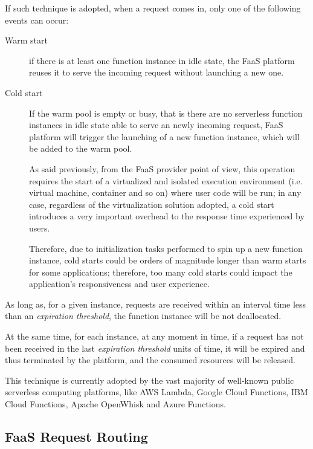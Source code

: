 \documentclass[12pt,a4paper]{report}
\begin{document}
If such technique is adopted, when a request comes in, only one of the following events can occur:

\begin{description}
	
	\item[Warm start] if there is at least one function instance in idle state, the FaaS platform reuses it to serve the incoming request without launching a new one.
	
	\item[Cold start] If the warm pool is empty or busy, that is there are no serverless function instances in idle state able to serve an newly incoming request, FaaS platform will trigger the launching of a new function instance, which will be added to the warm pool.
	
	As said previously, from the FaaS provider point of view, this operation requires the start of a virtualized and isolated execution environment (i.e. virtual machine, container and so on) where user code will be run; in any case, regardless of the virtualization solution adopted, a cold start introduces a very important overhead to the response time experienced by users. 
	
	Therefore, due to initialization tasks performed to spin up a new function instance, cold starts could be orders of magnitude longer than warm starts for some applications; therefore, too many cold starts could impact the application’s responsiveness and user experience.
\end{description} 

As long as, for a given instance, requests are received within an interval time less than an \textit{expiration threshold}, the function instance will be not deallocated.

At the same time, for each instance, at any moment in time, if a request has not been received in the last \textit{expiration threshold} units of time, it will be expired and thus terminated by the platform, and the consumed resources will be released. 

This technique is currently adopted by the vast majority of well-known public serverless computing platforms, like AWS Lambda, Google Cloud Functions, IBM Cloud Functions, Apache OpenWhisk and Azure Functions. 

\subsection{FaaS Request Routing}
\end{document}
